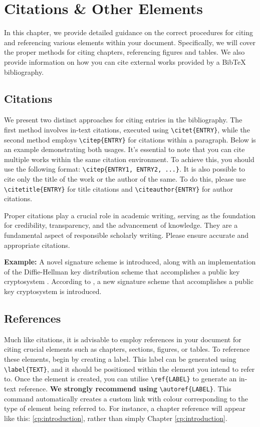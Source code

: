 \chapter{Citations \& Other Elements}
\label{cp:citations}
In this chapter, we provide detailed guidance on the correct procedures for citing and referencing various elements within your document. Specifically, we will cover the proper methods for citing chapters, referencing figures and tables. We also provide information on how you can cite external works provided by a BibTeX bibliography.

\section{Citations}
\label{sec:citations}
We present two distinct approaches for citing entries in the bibliography. The first method involves in-text citations, executed using \verb|\citet{ENTRY}|, while the second method employs \verb|\citep{ENTRY}| for citations within a paragraph. Below is an example demonstrating both usages. It's essential to note that you can cite multiple works within the same citation environment. To achieve this, you should use the following format: \verb|\citep{ENTRY1, ENTRY2, ...}|. It is also possible to cite only the title of the work or the author of the same. To do this, please use \verb|\citetitle{ENTRY}| for title citations and \verb|\citeauthor{ENTRY}| for author citations.

\begin{importantbox}
Proper citations play a crucial role in academic writing, serving as the foundation for credibility, transparency, and the advancement of knowledge. They are a fundamental aspect of responsible scholarly writing. Please ensure accurate and appropriate citations.
\end{importantbox}

\noindent\textbf{Example:} A novel signature scheme is introduced, along with an implementation of the Diffie-Hellman key distribution scheme that accomplishes a public key cryptosystem \citep{一个人类}. According to \citet{一个人类}, a new signature scheme that accomplishes a public key cryptosystem is introduced.

\section{References}
Much like citations, it is advisable to employ references in your document for citing crucial elements such as chapters, sections, figures, or tables. To reference these elements, begin by creating a label. This label can be generated using \verb|\label{TEXT}|, and it should be positioned within the element you intend to refer to. Once the element is created, you can utilise \verb|\ref{LABEL}| to generate an in-text reference. \textbf{We strongly recommend using} \verb|\autoref{LABEL}|. This command automatically creates a custom link with colour corresponding to the type of element being referred to. For instance, a chapter reference will appear like this: \autoref{cp:introduction}, rather than simply Chapter \ref{cp:introduction}. 

